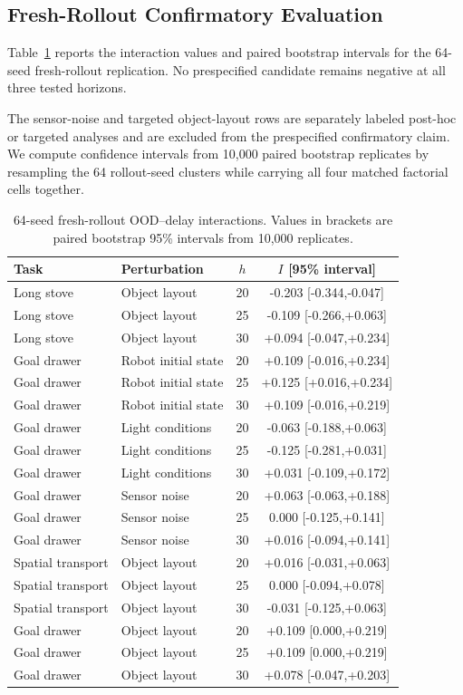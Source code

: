 \documentclass{article}
\begin{document}
\subsection{Fresh-Rollout Confirmatory Evaluation}

Table~\ref{tab:stage3_confirmation} reports the interaction values and paired bootstrap intervals for the 64-seed fresh-rollout replication. No prespecified candidate remains negative at all three tested horizons.

The sensor-noise and targeted object-layout rows are separately labeled post-hoc or targeted analyses and are excluded from the prespecified confirmatory claim. We compute confidence intervals from 10,000 paired bootstrap replicates by resampling the 64 rollout-seed clusters while carrying all four matched factorial cells together.

\begin{table}[h]
\centering
\small
\caption{64-seed fresh-rollout OOD--delay interactions. Values in brackets are paired bootstrap 95\% intervals from 10,000 replicates.}
\label{tab:stage3_confirmation}
\begin{tabular}{l|l|c|c}
\hline
Task & Perturbation & \(h\) & \(I\) [95\% interval] \\
\hline
Long stove & Object layout & 20 & -0.203 [-0.344,-0.047] \\
Long stove & Object layout & 25 & -0.109 [-0.266,+0.063] \\
Long stove & Object layout & 30 & +0.094 [-0.047,+0.234] \\
\hline
Goal drawer & Robot initial state & 20 & +0.109 [-0.016,+0.234] \\
Goal drawer & Robot initial state & 25 & +0.125 [+0.016,+0.234] \\
Goal drawer & Robot initial state & 30 & +0.109 [-0.016,+0.219] \\
\hline
Goal drawer & Light conditions & 20 & -0.063 [-0.188,+0.063] \\
Goal drawer & Light conditions & 25 & -0.125 [-0.281,+0.031] \\
Goal drawer & Light conditions & 30 & +0.031 [-0.109,+0.172] \\
\hline
Goal drawer & Sensor noise & 20 & +0.063 [-0.063,+0.188] \\
Goal drawer & Sensor noise & 25 & 0.000 [-0.125,+0.141] \\
Goal drawer & Sensor noise & 30 & +0.016 [-0.094,+0.141] \\
\hline
Spatial transport & Object layout & 20 & +0.016 [-0.031,+0.063] \\
Spatial transport & Object layout & 25 & 0.000 [-0.094,+0.078] \\
Spatial transport & Object layout & 30 & -0.031 [-0.125,+0.063] \\
\hline
Goal drawer & Object layout & 20 & +0.109 [0.000,+0.219] \\
Goal drawer & Object layout & 25 & +0.109 [0.000,+0.219] \\
Goal drawer & Object layout & 30 & +0.078 [-0.047,+0.203] \\
\hline
\end{tabular}
\end{table}
\end{document}
